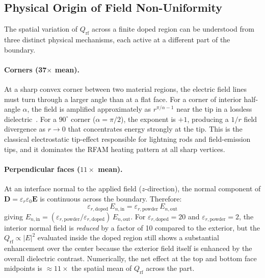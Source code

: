 \documentclass[5p,times]{elsarticle}
\newcommand{\Qrf}{Q_{\mathrm{rf}}}
\newcommand{\vect}[1]{\boldsymbol{#1}}
\begin{document}
\subsection{Physical Origin of Field Non-Uniformity}

The spatial variation of $\Qrf$ across a finite doped region can be
understood from three distinct physical mechanisms, each active at a
different part of the boundary.

\paragraph{Corners (37$\times$ mean).}
At a sharp convex corner between two material regions, the electric
field lines must turn through a larger angle than at a flat face.
For a corner of interior half-angle $\alpha$, the field is
amplified approximately as $r^{\pi/\alpha - 1}$ near the tip in a
lossless dielectric~\cite{Meixner1972singular}.  For a $90^\circ$
corner ($\alpha = \pi/2$), the exponent is $+1$, producing a $1/r$
field divergence as $r \to 0$ that concentrates energy strongly at
the tip.  This is the classical electrostatic tip-effect responsible
for lightning rods and field-emission tips, and it dominates the RFAM
heating pattern at all sharp vertices.

\paragraph{Perpendicular faces ($11\times$ mean).}
At an interface normal to the applied field ($z$-direction), the normal
component of $\vect{D} = \varepsilon_r\varepsilon_0\vect{E}$ is
continuous across the boundary.  Therefore:
\begin{equation}
  \varepsilon_{r,\mathrm{doped}}\,E_{n,\mathrm{in}} =
  \varepsilon_{r,\mathrm{powder}}\,E_{n,\mathrm{out}}
  \label{eq:normal_D_continuity}
\end{equation}
giving $E_{n,\mathrm{in}} = (\varepsilon_{r,\mathrm{powder}} /
\varepsilon_{r,\mathrm{doped}})\,E_{n,\mathrm{out}}$.  For
$\varepsilon_{r,\mathrm{doped}} = 20$ and $\varepsilon_{r,\mathrm{powder}} = 2$,
the interior normal field is \emph{reduced} by a factor of 10 compared
to the exterior, but the $\Qrf \propto |E|^{2}$ evaluated inside the
doped region still shows a substantial enhancement over the center
because the exterior field itself is enhanced by the overall
dielectric contrast.  Numerically, the net effect at the top and
bottom face midpoints is $\approx 11\times$ the spatial mean of
$\Qrf$ across the part.
\end{document}
